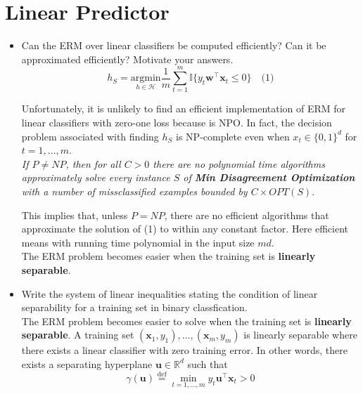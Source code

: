 \newpage
\section{Linear Predictor}

\begin{itemize}

    \item Can the ERM over linear classifiers be computed efficiently? Can it be approximated efficiently? Motivate your answers.\\
       
        $$
        h_{S} = \underset{h \in \mathcal{H}}{\text{argmin}} \frac{1}{m} \sum_{t=1}^{m} \mathbb{I}\{y_t \boldsymbol{w}^{\top}\boldsymbol{x}_t \leq 0\} \quad \text{(1)}
        $$

        Unfortunately, it is unlikely to find an efficient implementation of ERM for linear classifiers with zero-one loss because is NPO. In fact, the decision problem associated with finding $h_{S}$ is NP-complete even when $x_t \in \{0,1\}^d$ for $t = 1, \dots, m$.\\

        \textit{If $P \neq NP$, then for all $C > 0$ there are no polynomial time algorithms approximately solve every instance $S$ of \textbf{Min Disagreement Optimization} with a number of missclassified examples bounded by $C \times OPT(S)$}.

        This implies that, unless $P = NP$, there are no efficient algorithms that approximate the solution of (1) to within any constant factor. Here efficient means with running time polynomial in the input size $md$.\\
        The ERM problem becomes easier when the training set is \textbf{linearly separable}.

    \item Write the system of linear inequalities stating the condition of linear separability for a training set in binary classfication.\\

        The ERM problem becomes easier to solve when the training set is \textbf{linearly separable}. A training set $(\boldsymbol{x}_1 , y_1 ), \dots, (\boldsymbol{x}_m , y_m)$ is linearly separable where there exists a linear classifier with zero training error. In other words, there exists a separating hyperplane $\boldsymbol{u} \in \mathbb{R}^d$ such that
        $$
        \gamma(\boldsymbol{u}) \overset{\text{def}}{=} \min_{t=1, \dots, m} y_t \boldsymbol{u}^{\top}\boldsymbol{x}_t > 0
        $$ 


\end{itemize}
